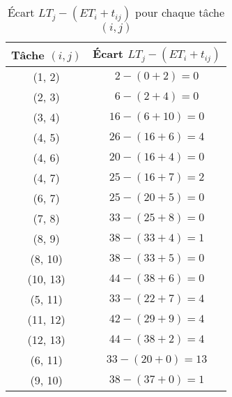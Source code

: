 \documentclass{report}
\begin{document}
\begin{multicols*}{2}
             \begin{table}[H]
              \begin{center}
   \begin{tabular}{|c|c|}
        \hline
        \textbf{Tâche $(i, j)$} & \textbf{Écart $LT_j - (ET_i + t_{ij})$} \\
        \hline
        (1, 2) & $2 - (0 + 2) = 0$ \\
        (2, 3) & $6 - (2 + 4) = 0$ \\
        (3, 4) & $16 - (6 + 10) = 0$ \\
        (4, 5) & $26 - (16 + 6) = 4$ \\
        (4, 6) & $20 - (16 + 4) = 0$ \\
        (4, 7) & $25 - (16 + 7) = 2$ \\
        (6, 7) & $25 - (20 + 5) = 0$ \\
        (7, 8) & $33 - (25 + 8) = 0$ \\
        (8, 9) & $38 - (33 + 4) = 1$ \\
        (8, 10) & $38 - (33 + 5) = 0$ \\
        (10, 13) & $44 - (38 + 6) = 0$ \\
        (5, 11) & $33 - (22 + 7) = 4$ \\
        (11, 12) & $42 - (29 + 9) = 4$ \\
        (12, 13) & $44 - (38 + 2) = 4$ \\
        (6, 11) & $33 - (20 + 0) = 13$ \\
        (9, 10) & $38 - (37 + 0) = 1$ \\
        \hline
    \end{tabular}                
\end{center}
\caption{Écart $LT_j - (ET_i + t_{ij})$ pour chaque tâche $(i, j)$}
            \end{table}



            \begin{center}
            \scalebox{0.75}{
                \begin{tikzpicture}[main/.style = {draw, circle}, scale=0.75]] 
                  \node[main] (1) at (0,13) {1};
                  \node[right=0.25cm of 1, text=myg] {$0$};
                  \node[left=0.25cm of 1, text=myb] {$0$};
                  
                  \node[main] (2) at (0,10)  {2};
                  \node[right=0.25cm of 2, text=myg] {$2$};
                  \node[left=0.25cm of 2, text=myb] {$2$};
                  

\end{tikzpicture}}
\end{center}
\end{multicols*}
\end{document}
